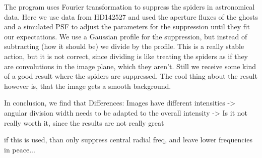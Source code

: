 The program uses Fourier transformation to suppress the spiders in astronomical data.
Here we use data from HD142527 and used the aperture fluxes of the ghosts and 
a simulated PSF to adjust the parameters for the suppression until they fit our
expectations. 
We use a Gaussian profile for the suppression, but instead of subtracting (how
it should be) we divide by the profile. This is a really stable action, but it 
is not correct, since dividing is like treating the spiders as if they are 
convolutions in the image plane, which they aren't. Still we receive some kind 
of a good result where the spiders are suppressed. The cool thing about the 
result however is, that the image gets a smooth background.


In conclusion, we find that 
Differences: Images have different intensities -> angular division width needs to be adapted to the overall intensity -> Is it not really worth it, since the results are not really great

if this is used, than only suppress central radial freq, and leave lower frequencies in peace...